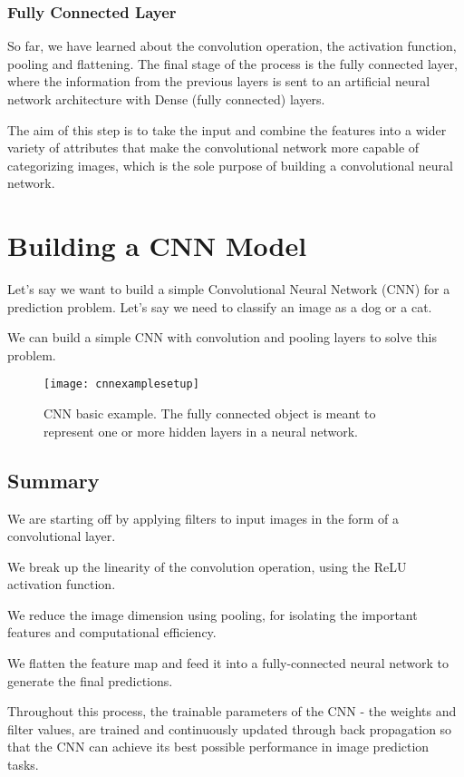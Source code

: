 	\subsubsection{Fully Connected Layer}
	\begin{bulletedlist}
		\item So far, we have learned about the convolution operation, the activation function, pooling and flattening. The final stage of the process is the fully connected layer, where the information from the previous layers is sent to an artificial neural network architecture with Dense (fully connected) layers.
		\item The aim of this step is to take the input and combine the features into a wider variety of attributes that make the convolutional network more capable of categorizing images, which is the sole purpose of building a convolutional neural network.
	\end{bulletedlist}

	\section{Building a CNN Model}
	\begin{bulletedlist}
		\item Let's say we want to build a simple Convolutional Neural Network (CNN) for a prediction problem.  Let's say we need to classify an image as a dog or a cat.
		\item We can build a simple CNN with convolution and pooling layers to solve this problem.
	\end{bulletedlist}

	\begin{figure}[tbh]
		\centering
		\texttt{[image: cnnexamplesetup]}
		\caption[CNN basic example]{CNN basic example.  The fully connected object is meant to represent one or more hidden layers in a neural network.}
		\label{fig:cnnexamplesetup}
	\end{figure}

	\subsection{Summary}
	\begin{bulletedlist}
		\item We are starting off by applying filters to input images in the form of a convolutional layer.
		\item We break up the linearity of the convolution operation, using the ReLU activation function.
		\item We reduce the image dimension using pooling, for isolating the important features and computational efficiency.
		\item We flatten the feature map and feed it into a fully-connected neural network to generate the final predictions.
		\item Throughout this process, the trainable parameters of the CNN - the weights and filter values, are trained and continuously updated through back propagation so that the CNN can achieve its best possible performance in image prediction tasks.
	\end{bulletedlist}

